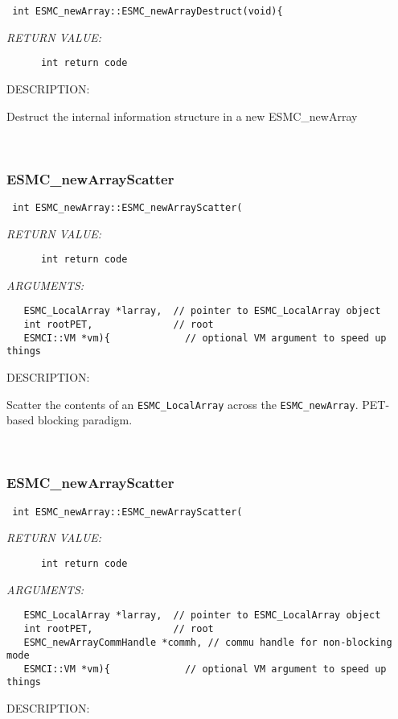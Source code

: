   
\begin{verbatim} int ESMC_newArray::ESMC_newArrayDestruct(void){\end{verbatim}{\em RETURN VALUE:}
\begin{verbatim}      int return code\end{verbatim}
{\sf DESCRIPTION:\\ }


      Destruct the internal information structure in a new ESMC\_newArray
   
 
\mbox{}\hrulefill\
 
\subsubsection [ESMC\_newArrayScatter] {ESMC\_newArrayScatter}


  
\begin{verbatim} int ESMC_newArray::ESMC_newArrayScatter(\end{verbatim}{\em RETURN VALUE:}
\begin{verbatim}      int return code\end{verbatim}{\em ARGUMENTS:}
\begin{verbatim}   ESMC_LocalArray *larray,  // pointer to ESMC_LocalArray object
   int rootPET,              // root
   ESMCI::VM *vm){             // optional VM argument to speed up things\end{verbatim}
{\sf DESCRIPTION:\\ }


      Scatter the contents of an {\tt ESMC\_LocalArray} across the
      {\tt ESMC\_newArray}. PET-based blocking paradigm.
   
 
\mbox{}\hrulefill\
 
\subsubsection [ESMC\_newArrayScatter] {ESMC\_newArrayScatter}


  
\begin{verbatim} int ESMC_newArray::ESMC_newArrayScatter(\end{verbatim}{\em RETURN VALUE:}
\begin{verbatim}      int return code\end{verbatim}{\em ARGUMENTS:}
\begin{verbatim}   ESMC_LocalArray *larray,  // pointer to ESMC_LocalArray object
   int rootPET,              // root
   ESMC_newArrayCommHandle *commh, // commu handle for non-blocking mode
   ESMCI::VM *vm){             // optional VM argument to speed up things\end{verbatim}
{\sf DESCRIPTION:\\ }


